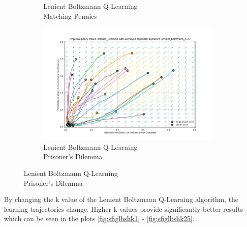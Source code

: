 \documentclass[12pt,letterpaper, onecolumn]{exam}
\begin{document}
\begin{figure}[H]
\begin{subfigure}{.5\textwidth}
      \caption{Lenient Boltzmann Q-Learning\\ Matching Pennies}
      \label{fig:sfiglbmp}
    \end{subfigure}%
    \begin{subfigure}{.5\textwidth}
      \centering
      \includegraphics[width=.6\linewidth]{plots/replicator_trajectoreis_Prisoner_Dilemma_lenient_boltzmann_K=5.png}
      \caption{Lenient Boltzmann Q-Learning\\ Prisoner's Dilemma}
      \label{fig:sfiglbpd}
    \end{subfigure}%
\end{figure}

By changing the k value of the Lenient Boltzmann Q-Learning algorithm, the learning trajectories change.
Higher k values provide significantly better results which can be seen in the plots \ref{fig:sfiglbshk1} - \ref{fig:sfiglbshk25}.
\end{document}
